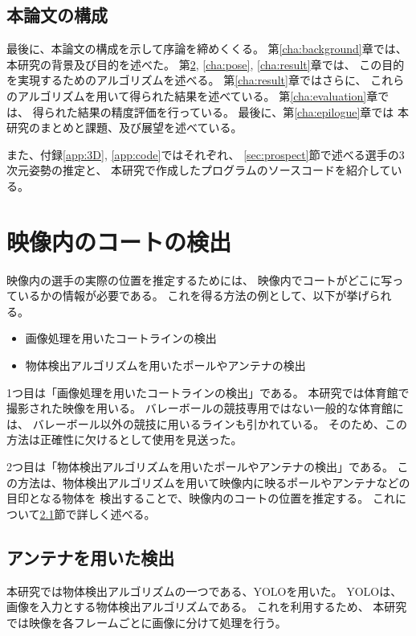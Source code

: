\documentclass[a4j, fleqn, 12pt]{jsreport}
\begin{document}
    \section{本論文の構成}
        最後に、本論文の構成を示して序論を締めくくる。
        第\ref{cha:background}章では、本研究の背景及び目的を述べた。
        第\ref{cha:detect}, \ref{cha:pose}, \ref{cha:result}章では、
        この目的を実現するためのアルゴリズムを述べる。
        第\ref{cha:result}章ではさらに、
        これらのアルゴリズムを用いて得られた結果を述べている。
        第\ref{cha:evaluation}章では、
        得られた結果の精度評価を行っている。
        最後に、第\ref{cha:epilogue}章では
        本研究のまとめと課題、及び展望を述べている。

        また、付録\ref{app:3D}, \ref{app:code}ではそれぞれ、
        \ref{sec:prospect}節で述べる選手の3次元姿勢の推定と、
        本研究で作成したプログラムのソースコードを紹介している。

\chapter{映像内のコートの検出} \label{cha:detect}
    映像内の選手の実際の位置を推定するためには、
    映像内でコートがどこに写っているかの情報が必要である。
    これを得る方法の例として、以下が挙げられる。

    \begin{itemize}
        \item 画像処理を用いたコートラインの検出
        \item 物体検出アルゴリズムを用いたポールやアンテナの検出
    \end{itemize}

    1つ目は「画像処理を用いたコートラインの検出」である。
    本研究では体育館で撮影された映像を用いる。
    バレーボールの競技専用ではない一般的な体育館には、
    バレーボール以外の競技に用いるラインも引かれている。
    そのため、この方法は正確性に欠けるとして使用を見送った。

    2つ目は「物体検出アルゴリズムを用いたポールやアンテナの検出」である。
    この方法は、物体検出アルゴリズムを用いて映像内に映るポールやアンテナなどの目印となる物体を
    検出することで、映像内のコートの位置を推定する。
    これについて\ref{sec:antenna}節で詳しく述べる。

    \section{アンテナを用いた検出} \label{sec:antenna}
        本研究では物体検出アルゴリズムの一つである、YOLO\cite{Joseph}を用いた。
        YOLOは、画像を入力とする物体検出アルゴリズムである。
        これを利用するため、
        本研究では映像を各フレームごとに画像に分けて処理を行う。
\end{document}
